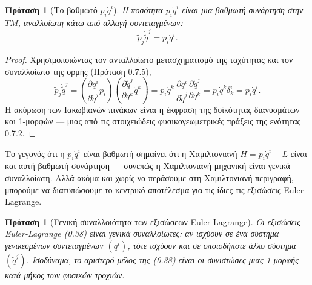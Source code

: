 \documentclass[11pt,a4paper,twoside,openright]{book}
\newtheorem{proposition}[lemma]{Πρόταση}
\begin{document}
\begin{proposition}[Το βαθμωτό $p_i \dot{q}^i$]
Η ποσότητα $p_i \dot{q}^i$ είναι μια βαθμωτή συνάρτηση στην $TM$, αναλλοίωτη κάτω από αλλαγή συντεταγμένων:
\begin{equation}
\tilde{p}_j \dot{\tilde{q}}^j = p_i \dot{q}^i. \tag{0.41}
\end{equation}
\end{proposition}

\begin{proof}
Χρησιμοποιώντας τον ανταλλοίωτο μετασχηματισμό της ταχύτητας και τον συναλλοίωτο της ορμής (Πρόταση 0.7.5),
\begin{equation}
\tilde{p}_j \dot{\tilde{q}}^j = \left( \frac{\partial q^i}{\partial \tilde{q}^j} p_i \right) \left( \frac{\partial \tilde{q}^j}{\partial q^k} \dot{q}^k \right) = p_i \dot{q}^k \, \frac{\partial q^i}{\partial \tilde{q}^j} \frac{\partial \tilde{q}^j}{\partial q^k} = p_i \dot{q}^k \delta^i_k = p_i \dot{q}^i.
\end{equation}
Η ακύρωση των Ιακωβιανών πινάκων είναι η έκφραση της δυϊκότητας διανυσμάτων και 1-μορφών — μιας από τις στοιχειώδεις φυσικογεωμετρικές πράξεις της ενότητας 0.7.2.
\end{proof}

Το γεγονός ότι η $p_i \dot{q}^i$ είναι βαθμωτή σημαίνει ότι η Χαμιλτονιανή $H = p_i \dot{q}^i - L$ είναι και αυτή βαθμωτή συνάρτηση — συνεπώς η Χαμιλτονιανή μηχανική είναι γενικά συναλλοίωτη. Αλλά ακόμα και χωρίς να περάσουμε στη Χαμιλτονιανή περιγραφή, μπορούμε να διατυπώσουμε το κεντρικό αποτέλεσμα για τις ίδιες τις εξισώσεις Euler-Lagrange.

\begin{proposition}[Γενική συναλλοιότητα των εξισώσεων Euler-Lagrange]
Οι εξισώσεις Euler-Lagrange (0.38) είναι γενικά συναλλοίωτες: αν ισχύουν σε ένα σύστημα γενικευμένων συντεταγμένων $(q^i)$, τότε ισχύουν και σε οποιοδήποτε άλλο σύστημα $(\tilde{q}^j)$. Ισοδύναμα, το αριστερό μέλος της (0.38) είναι οι συνιστώσες μιας 1-μορφής κατά μήκος των φυσικών τροχιών.
\end{proposition}
\end{document}
